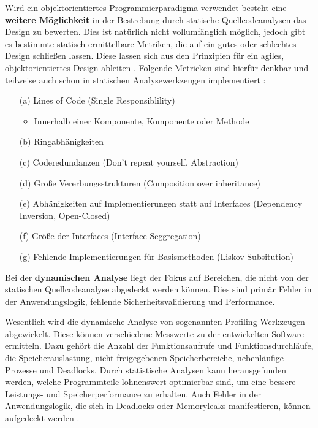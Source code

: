 Wird ein objektorientiertes Programmierparadigma verwendet besteht eine \textbf{weitere Möglichkeit} in der Bestrebung durch statische Quellcodeanalysen das Design zu bewerten. Dies ist natürlich nicht vollumfänglich möglich, jedoch gibt es bestimmte statisch ermittelbare Metriken, die 
auf ein gutes oder schlechtes Design schließen lassen. Diese lassen sich aus den Prinzipien für ein agiles, objektorientiertes Design ableiten \cite{Martin2002-nf}. Folgende Metricken sind hierfür denkbar und teilweise auch schon in statischen Analysewerkzeugen implementiert \cite{OwaspCodeReview2008}\cite{Darwin1988}\cite{jetbrains_static_analyse}\cite{wiki:Statische_Code-Analyse}:
\begin{itemize}
	\item[(a)] Lines of Code (Single Responsiblility)
	\begin{itemize}
		\item Innerhalb einer Komponente, Komponente oder Methode
	\end{itemize}	
	\item[(b)] Ringabhänigkeiten
	\item[(c)] Coderedundanzen (Don't repeat yourself, Abstraction)
	\item[(d)] Große Vererbungsstrukturen (Composition over inheritance)
	\item[(e)] Abhänigkeiten auf Implementierungen statt auf Interfaces (Dependency Inversion, Open-Closed)
	\item[(f)] Größe der Interfaces (Interface Seggregation)
	\item[(g)] Fehlende Implementierungen für Basismethoden (Liskov Subsitution)
\end{itemize}

Bei der \textbf{dynamischen Analyse} liegt der Fokus auf Bereichen, die nicht von der statischen Quellcodeanalyse abgedeckt werden können. Dies sind primär Fehler in der Anwendungslogik, fehlende Sicherheitsvalidierung und Performance. 

Wesentlich wird die dynamische Analyse von sogenannten Profiling Werkzeugen abgewickelt. Diese können verschiedene Messwerte zu der entwickelten Software ermitteln. Dazu gehört die Anzahl der Funktionsaufrufe und Funktionsdurchläufe, die Speicherauslastung, nicht freigegebenen Speicherbereiche, nebenläufige Prozesse und Deadlocks. Durch statistische Analysen kann herausgefunden werden, welche Programmteile lohnenswert optimierbar sind, um eine bessere Leistungs- und Speicherperformance zu erhalten. Auch Fehler in der Anwendungslogik, die sich in Deadlocks oder Memoryleaks manifestieren, können aufgedeckt werden \cite{mci/Papenbrock2019}\cite{wiki:Profiler_Programmierung}\cite{computerweekly_dynamic_code}\cite{embedded_swe_codeanalysis}. \label{subsubsec:dynamic}


